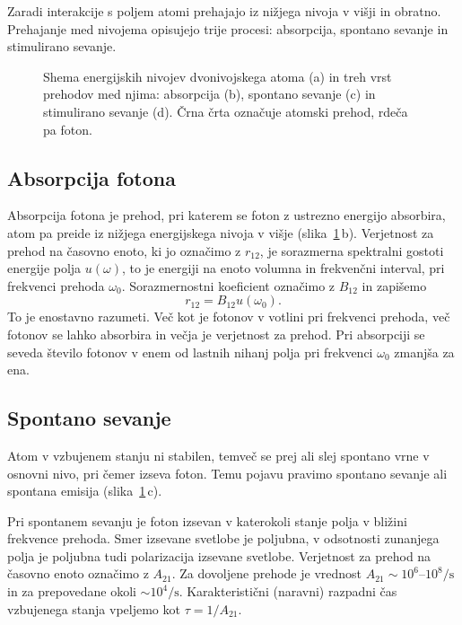 Zaradi interakcije s poljem
atomi prehajajo iz nižjega nivoja v višji in obratno. Prehajanje 
med nivojema opisujejo trije procesi: 
absorpcija, spontano sevanje in stimulirano sevanje.

\begin{figure}[h]
\centering
\def\svgwidth{145truemm} 

\caption{Shema energijskih nivojev dvonivojskega atoma (a) in treh vrst prehodov med njima:
absorpcija (b), spontano sevanje (c) in stimulirano sevanje (d). Črna črta označuje atomski
prehod, rdeča pa foton.}
\label{sl4.1}
\end{figure}

\subsection*{Absorpcija fotona}
Absorpcija fotona je prehod, pri katerem se foton 
z ustrezno energijo absorbira, atom pa preide iz nižjega energijskega nivoja 
v višje (slika~\ref{sl4.1}\,b). 
Verjetnost za prehod na časovno enoto, ki jo označimo z $r_{12}$, 
je sorazmerna spektralni gostoti energije polja $u(\omega)$, 
to je energiji na enoto volumna in frekvenčni interval, pri frekvenci prehoda $\omega_{0}$.
Sorazmernostni koeficient označimo z $B_{12}$ in 
zapišemo
\begin{equation}
r_{12}=B_{12}u(\omega_{0}).
\label{4.16}
\end{equation}
To je enostavno razumeti. Več kot je fotonov v votlini pri frekvenci prehoda, 
več fotonov se lahko absorbira in večja je verjetnost za prehod. Pri absorpciji se
seveda število fotonov v enem od lastnih nihanj polja pri frekvenci
$\omega_{0}$ zmanjša za ena.

\subsection*{Spontano sevanje}
Atom v vzbujenem stanju ni stabilen, temveč se prej ali slej spontano vrne 
v osnovni nivo, pri čemer izseva foton. Temu pojavu pravimo spontano sevanje 
ali spontana emisija (slika~\ref{sl4.1}\,c).

Pri spontanem sevanju je foton izsevan v katerokoli stanje polja v bližini 
frekvence prehoda. Smer izsevane svetlobe je poljubna, v odsotnosti zunanjega polja
je poljubna tudi polarizacija izsevane svetlobe.
Verjetnost za prehod na časovno enoto označimo z $A_{21}$.
Za dovoljene prehode je vrednost $A_{21} \sim 10^6$--$10^8/\si{\second}$ in 
za prepovedane okoli $\sim 10^4/\si{\second}$. Karakteristični (naravni) 
razpadni čas vzbujenega stanja vpeljemo kot
$\tau = 1/A_{21}$. 

